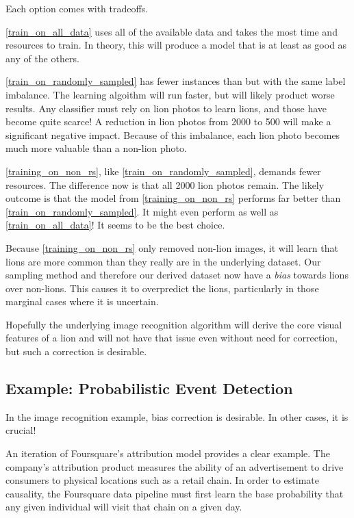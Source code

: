 \documentclass[twoside]{article}
\begin{document}
Each option comes with tradeoffs.

\ref{train_on_all_data} uses all of the available data and takes the most time and resources to train. In theory, this will produce a model that is at least as good as any of the others.

\ref{train_on_randomly_sampled} has fewer instances than \label{train_on_all_data} but with the same label imbalance. The learning algoithm will run faster, but will likely product worse results. Any classifier must rely on lion photos to learn lions, and those have become quite scarce! A reduction in lion photos from 2000 to 500 will make a significant negative impact. Because of this imbalance, each lion photo becomes much more valuable than a non-lion photo. 

\ref{training_on_non_rs}, like \ref{train_on_randomly_sampled}, demands fewer resources. The difference now is that all 2000 lion photos remain. The likely outcome is that the model from \ref{training_on_non_rs} performs far better than \ref{train_on_randomly_sampled}. It might even perform as well as \ref{train_on_all_data}! It seems to be the best choice.

Because \ref{training_on_non_rs} only removed non-lion images, it will learn that lions are more common than they really are in the underlying dataset. Our sampling method and therefore our derived dataset now have a \textit{bias} towards lions over non-lions. This causes it to overpredict the lions, particularly in those marginal cases where it is uncertain.

Hopefully the underlying image recognition algorithm will derive the core visual features of a lion and will not have that issue even without need for correction, but such a correction is desirable.

\subsection{Example: Probabilistic Event Detection}
\label{section:visit}

In the image recognition example, bias correction is desirable. In other cases, it is crucial!

An iteration of Foursquare’s attribution model\cite{visitprediction} provides a clear example. The company's attribution product measures the ability of an advertisement to drive consumers to physical locations such as a retail chain. In order to estimate causality, the Foursquare data pipeline must first learn the base probability that any given individual will visit that chain on a given day.
\end{document}

